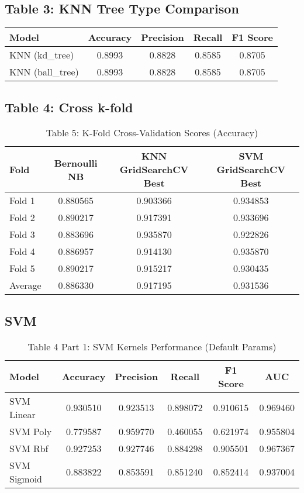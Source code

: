 \documentclass[12pt]{article}
\begin{document}
\vspace{1em}

\subsection*{Table 3: KNN Tree Type Comparison}
\begin{center}
\begin{tabular}{lcccc}
\toprule
\textbf{Model} & \textbf{Accuracy} & \textbf{Precision} & \textbf{Recall} & \textbf{F1 Score} \\
\midrule
KNN (kd\_tree)   & 0.8993 & 0.8828 & 0.8585 & 0.8705 \\
KNN (ball\_tree) & 0.8993 & 0.8828 & 0.8585 & 0.8705 \\
\bottomrule
\end{tabular}
\end{center}

\subsection*{Table 4: Cross k-fold}
\begin{table}[h!]
\centering
\caption{Table 5: K-Fold Cross-Validation Scores (Accuracy)}
\begin{tabular}{lccc}
\hline
\textbf{Fold} & \textbf{Bernoulli NB} & \textbf{KNN GridSearchCV Best} & \textbf{SVM GridSearchCV Best} \\
\hline
Fold 1  & 0.880565 & 0.903366 & 0.934853 \\
Fold 2  & 0.890217 & 0.917391 & 0.933696 \\
Fold 3  & 0.883696 & 0.935870 & 0.922826 \\
Fold 4  & 0.886957 & 0.914130 & 0.935870 \\
Fold 5  & 0.890217 & 0.915217 & 0.930435 \\
\hline
Average & 0.886330 & 0.917195 & 0.931536 \\
\hline
\end{tabular}
\end{table}

\subsection*{SVM }
\begin{table}[h!]
\centering
\caption{Table 4 Part 1: SVM Kernels Performance (Default Params)}
\begin{tabular}{lccccc}
\hline
\textbf{Model} & \textbf{Accuracy} & \textbf{Precision} & \textbf{Recall} & \textbf{F1 Score} & \textbf{AUC} \\
\hline
SVM Linear   & 0.930510 & 0.923513 & 0.898072 & 0.910615 & 0.969460 \\
SVM Poly     & 0.779587 & 0.959770 & 0.460055 & 0.621974 & 0.955804 \\
SVM Rbf      & 0.927253 & 0.927746 & 0.884298 & 0.905501 & 0.967367 \\
SVM Sigmoid  & 0.883822 & 0.853591 & 0.851240 & 0.852414 & 0.937004 \\
\hline
\end{tabular}
\end{table}
\end{document}
